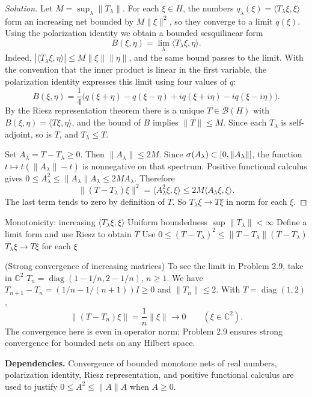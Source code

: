 \begin{proof}[Solution]
Let $M=\sup_\lambda\|T_\lambda\|$. For each $\xi\in H$, the numbers
$q_\lambda(\xi)=\langle T_\lambda\xi,\xi\rangle$ form an increasing net bounded by
$M\|\xi\|^2$, so they converge to a limit $q(\xi)$. Using the polarization identity we obtain
a bounded sesquilinear form
\[
 B(\xi,\eta)=\lim_\lambda\langle T_\lambda\xi,\eta\rangle.
\]
Indeed, $|\langle T_\lambda\xi,\eta\rangle|\le M\|\xi\|\|\eta\|$, and the same bound passes to the
limit.
With the convention that the inner product is linear in the first variable, the polarization identity
expresses this limit using four values of $q$:
\[
 B(\xi,\eta)=\frac14\bigl(q(\xi+\eta)-q(\xi-\eta)
   +i q(\xi+i\eta)-i q(\xi-i\eta)\bigr).
\]
By the Riesz representation theorem there is a unique $T\in\mathcal B(H)$ with
$B(\xi,\eta)=\langle T\xi,\eta\rangle$, and the bound of $B$ implies $\|T\|\le M$.
Since each $T_\lambda$ is self-adjoint, so is $T$, and
$T_\lambda\le T$.

Set $A_\lambda=T-T_\lambda\ge0$. Then
$\|A_\lambda\|\le 2M$. Since
$\sigma(A_\lambda)\subset[0,\|A_\lambda\|]$, the function
$t\mapsto t(\|A_\lambda\|-t)$ is nonnegative on that spectrum. Positive functional calculus
gives $0\le A_\lambda^2\le\|A_\lambda\|A_\lambda\le2M A_\lambda$. Therefore
\[
\|(T-T_\lambda)\xi\|^2
=\langle A_\lambda^2\xi,\xi\rangle
\le2M\langle A_\lambda\xi,\xi\rangle.
\]
The last term tends to zero by definition of $T$. So
$T_\lambda\xi\to T\xi$ in norm for each $\xi$.
\end{proof}

\proofdiagrambranch
{Monotonicity: increasing $\langle T_\lambda\xi,\xi\rangle$}
{Uniform boundedness $\sup\|T_\lambda\|<\infty$}
{Define a limit form and use Riesz to obtain $T$}
{Use $0\le(T-T_\lambda)^2\le\|T-T_\lambda\|(T-T_\lambda)$}
{$T_\lambda\xi\to T\xi$ for each $\xi$}

\begin{cthejemplo}{(Strong convergence of increasing matrices)}
To see the limit in Problem 2.9, take in $\mathbb C^2$
$T_n=\operatorname{diag}(1-1/n,2-1/n)$, $n\ge1$.
We have $T_{n+1}-T_n=(1/n-1/(n+1))I\ge0$ and $\|T_n\|\le2$.
With $T=\operatorname{diag}(1,2)$,
\[
 \|(T-T_n)\xi\|=\frac1n\|\xi\|\longrightarrow0
 \qquad(\xi\in\mathbb C^2).
\]
The convergence here is even in operator norm; Problem 2.9 ensures strong convergence
for bounded nets on any Hilbert space.
\end{cthejemplo}

\noindent\textbf{Dependencies.} Convergence of bounded monotone nets of real numbers, polarization identity, Riesz representation, and positive functional calculus are used to justify $0\le A^2\le\|A\|A$ when $A\ge0$.

